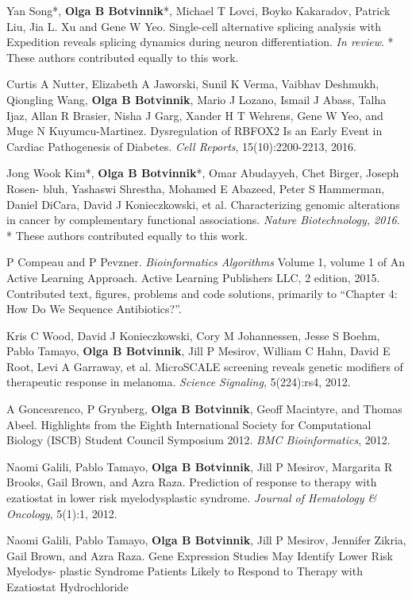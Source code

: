 \begin{frontmatter}
\begin{vitapage}
\begin{publications}
\item Yan Song*, \textbf{Olga B Botvinnik}*, Michael T Lovci, Boyko Kakaradov, Patrick Liu, Jia L. Xu and Gene W Yeo. Single-cell alternative splicing analysis with Expedition reveals splicing dynamics during neuron differentiation. \emph{In review}. * These authors contributed equally to this work.
\item Curtis A Nutter, Elizabeth A Jaworski, Sunil K Verma, Vaibhav Deshmukh, Qiongling Wang, \textbf{Olga B Botvinnik}, Mario J Lozano, Ismail J Abass, Talha Ijaz, Allan R Brasier, Nisha J Garg, Xander H T Wehrens, Gene W Yeo, and Muge N Kuyumcu-Martinez. Dysregulation of RBFOX2 Is an Early Event in Cardiac Pathogenesis of Diabetes. \emph{Cell Reports}, 15(10):2200-2213, 2016.
\item Jong Wook Kim*, \textbf{Olga B Botvinnik}*, Omar Abudayyeh, Chet Birger, Joseph Rosen- bluh, Yashaswi Shrestha, Mohamed E Abazeed, Peter S Hammerman, Daniel DiCara, David J Konieczkowski, et al. Characterizing genomic alterations in cancer by complementary functional associations. \emph{Nature Biotechnology, 2016}. * These authors contributed equally to this work.
\item P Compeau and P Pevzner. \emph{Bioinformatics Algorithms} Volume 1, volume 1 of An Active Learning Approach. Active Learning Publishers LLC, 2 edition, 2015. Contributed text, figures, problems and code solutions, primarily to ``Chapter 4: How Do We Sequence Antibiotics?''.
\item Kris C Wood, David J Konieczkowski, Cory M Johannessen, Jesse S Boehm, Pablo Tamayo, \textbf{Olga B Botvinnik}, Jill P Mesirov, William C Hahn, David E Root, Levi A Garraway, et al. MicroSCALE screening reveals genetic modifiers of therapeutic response in melanoma. \emph{Science Signaling}, 5(224):rs4, 2012.
\item A Goncearenco, P Grynberg, \textbf{Olga B Botvinnik}, Geoff Macintyre, and Thomas Abeel. Highlights from the Eighth International Society for Computational Biology (ISCB) Student Council Symposium 2012. \emph{BMC Bioinformatics}, 2012.
\item Naomi Galili, Pablo Tamayo, \textbf{Olga B Botvinnik}, Jill P Mesirov, Margarita R Brooks, Gail Brown, and Azra Raza. Prediction of response to therapy with ezatiostat in lower risk myelodysplastic syndrome. \emph{Journal of Hematology \& Oncology}, 5(1):1, 2012.
\item Naomi Galili, Pablo Tamayo, \textbf{Olga B Botvinnik}, Jill P Mesirov, Jennifer Zikria, Gail Brown, and Azra Raza. Gene Expression Studies May Identify Lower Risk Myelodys- plastic Syndrome Patients Likely to Respond to Therapy with Ezatiostat Hydrochloride

\end{publications}
\end{vitapage}
\end{frontmatter}
